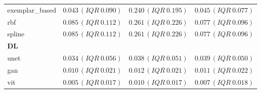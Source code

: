 \begin{table}[htbp]
{\begin{tabular}{lccc}
exemplar\_based & $0.043\,(IQR\ 0.090)$ & $0.240\,(IQR\ 0.195)$ & $0.045\,(IQR\ 0.077)$ \\
rbf & $0.085\,(IQR\ 0.112)$ & $0.261\,(IQR\ 0.226)$ & $0.077\,(IQR\ 0.096)$ \\
spline & $0.085\,(IQR\ 0.112)$ & $0.261\,(IQR\ 0.226)$ & $0.077\,(IQR\ 0.096)$ \\
\midrule
\multicolumn{4}{l}{\textbf{DL}} \\
unet & $0.034\,(IQR\ 0.056)$ & $0.038\,(IQR\ 0.051)$ & $0.039\,(IQR\ 0.050)$ \\
gan & $0.010\,(IQR\ 0.021)$ & $0.012\,(IQR\ 0.021)$ & $0.011\,(IQR\ 0.022)$ \\
vit & $0.005\,(IQR\ 0.017)$ & $0.010\,(IQR\ 0.017)$ & $0.007\,(IQR\ 0.018)$ \\
\bottomrule
\end{tabular}
}
\end{table}
